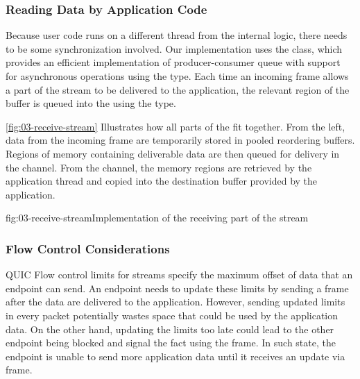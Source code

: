 \subsubsection{Reading Data by Application Code}

Because user code runs on a different thread from the internal \QuicConnection{} logic, there needs
to be some synchronization involved. Our implementation uses the  class, which
provides an efficient implementation of producer-consumer queue with support for asynchronous
operations using the  type. Each time an incoming \STREAM{} frame allows a part
of the stream to be delivered to the application, the relevant region of the buffer is queued into
the  using the  type.





\autoref{fig:03-receive-stream} Illustrates how all parts of the \ReceiveStream{} fit together.
From the left, data from the incoming \STREAM{} frame are temporarily stored in pooled reordering
buffers. Regions of memory containing deliverable data are then queued for delivery in the channel.
From the channel, the memory regions are retrieved by the application thread and copied into the
destination buffer provided by the application.

\begin{myFigure}{fig:03-receive-stream}{Implementation of the receiving part of the stream}

  \resizebox{\linewidth}{!}{}

\end{myFigure}

\subsubsection{Flow Control Considerations}

QUIC Flow control limits for streams specify the maximum offset of data that an endpoint can send.
An endpoint needs to update these limits by sending a \MAXSTREAMDATA{} frame after the data are
delivered to the application. However, sending updated limits in every packet potentially wastes
space that could be used by the application data. On the other hand, updating the limits too late
could lead to the other endpoint being blocked and signal the fact using the \STREAMDATABLOCKED{}
frame. In such state, the endpoint is unable to send more application data until it receives an
update via \MAXSTREAMDATA{} frame.

